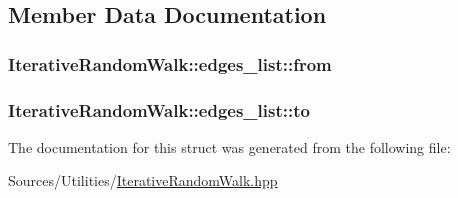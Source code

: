 \subsection{Member Data Documentation}
\hypertarget{struct_iterative_random_walk_1_1edges__list_a939cd47cfe0fc7d91ff26f1072546f0e}{
\subsubsection[{from}]{ Iterative\+Random\+Walk\+::edges\+\_\+list\+::from}}\label{struct_iterative_random_walk_1_1edges__list_a939cd47cfe0fc7d91ff26f1072546f0e}
\hypertarget{struct_iterative_random_walk_1_1edges__list_abbca71fc691d4490df3b110128ff9985}{
\subsubsection[{to}]{ Iterative\+Random\+Walk\+::edges\+\_\+list\+::to}}\label{struct_iterative_random_walk_1_1edges__list_abbca71fc691d4490df3b110128ff9985}


The documentation for this struct was generated from the following file\+:\begin{DoxyCompactItemize}
\item 
Sources/\+Utilities/\hyperlink{_iterative_random_walk_8hpp}{Iterative\+Random\+Walk.\+hpp}\end{DoxyCompactItemize}

